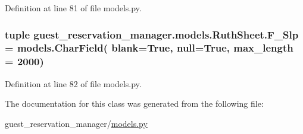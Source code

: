 Definition at line 81 of file models.\-py.

\hypertarget{classguest__reservation__manager_1_1models_1_1RuthSheet_ae107dd55fc2d50eb83049985378027ea}{
\subsubsection[{F\-\_\-\-Slp}]{\setlength{\rightskip}{0pt plus 5cm}tuple guest\-\_\-reservation\-\_\-manager.\-models.\-Ruth\-Sheet.\-F\-\_\-\-Slp = models.\-Char\-Field( blank=True, null=True, max\-\_\-length = 2000)\hspace{0.3cm}{\ttfamily [static]}}}\label{classguest__reservation__manager_1_1models_1_1RuthSheet_ae107dd55fc2d50eb83049985378027ea}


Definition at line 82 of file models.\-py.



The documentation for this class was generated from the following file\-:\begin{DoxyCompactItemize}
\item 
guest\-\_\-reservation\-\_\-manager/\hyperlink{guest__reservation__manager_2models_8py}{models.\-py}\end{DoxyCompactItemize}
